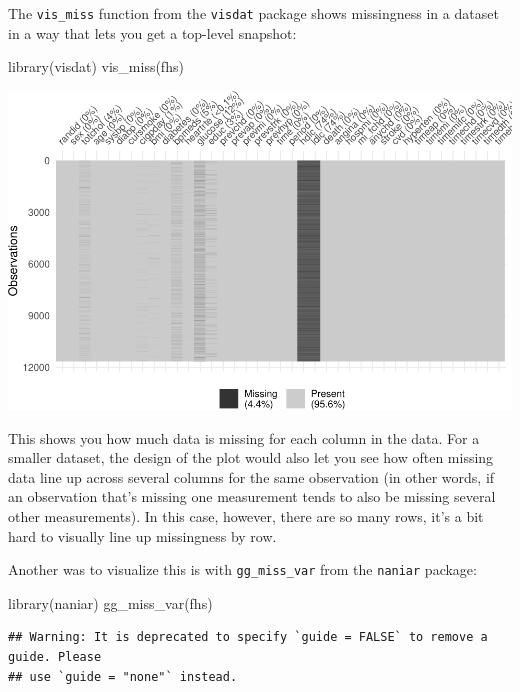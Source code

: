 \documentclass[
]{book}
\newenvironment{Shaded}{\begin{snugshade}}{\end{snugshade}}
\newcommand{\FunctionTok}[1]{\textcolor[rgb]{0.00,0.00,0.00}{#1}}
\newcommand{\NormalTok}[1]{#1}
\begin{document}
The \texttt{vis\_miss} function from the \texttt{visdat} package shows missingness in a dataset in a way that lets you
get a top-level snapshot:

\begin{Shaded}
\begin{Highlighting}[]
\FunctionTok{library}\NormalTok{(visdat)}
\FunctionTok{vis\_miss}\NormalTok{(fhs)}
\end{Highlighting}
\end{Shaded}

\includegraphics{adv_epi_analysis_files/figure-latex/unnamed-chunk-173-1.pdf}

This shows you how much data is missing for each column in the data. For a smaller dataset, the design of the plot would also let you see how often missing data line up across several columns for the same observation (in other words, if an observation that's missing one measurement tends to also be missing several other measurements). In this case, however, there are so many rows, it's a bit hard to visually line up missingness by row.

Another was to visualize this is with \texttt{gg\_miss\_var} from the \texttt{naniar} package:

\begin{Shaded}
\begin{Highlighting}[]
\FunctionTok{library}\NormalTok{(naniar)}
\FunctionTok{gg\_miss\_var}\NormalTok{(fhs)}
\end{Highlighting}
\end{Shaded}

\begin{verbatim}
## Warning: It is deprecated to specify `guide = FALSE` to remove a guide. Please
## use `guide = "none"` instead.
\end{verbatim}
\end{document}
